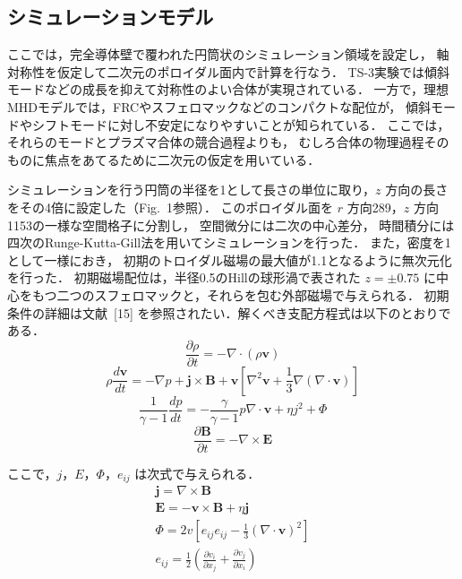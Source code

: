 \documentclass{jspf}            %
\begin{document}
\subsection{シミュレーションモデル}

ここでは，完全導体壁で覆われた円筒状のシミュレーション領域を設定し，
軸対称性を仮定して二次元のポロイダル面内で計算を行なう．
TS-3実験では傾斜モードなどの成長を抑えて対称性のよい合体が実現されている．
一方で，理想MHDモデルでは，FRCやスフェロマックなどのコンパクトな配位が，
傾斜モードやシフトモードに対し不安定になりやすいことが知られている．
ここでは，それらのモードとプラズマ合体の競合過程よりも，
むしろ合体の物理過程そのものに焦点をあてるために二次元の仮定を用いている．

シミュレーションを行う円筒の半径を1として長さの単位に取り，$z$
方向の長さをその4倍に設定した（Fig.~1参照）．
このポロイダル面を $r$ 方向289，$z$ 方向1153の一様な空間格子に分割し，
空間微分には二次の中心差分，
時間積分には四次のRunge-Kutta-Gill法を用いてシミュレーションを行った．
また，密度を1として一様におき，
初期のトロイダル磁場の最大値が1.1となるように無次元化を行った．
初期磁場配位は，半径0.5のHillの球形渦で表された $z = \pm 0.75$
に中心をもつ二つのスフェロマックと，それらを包む外部磁場で与えられる．
初期条件の詳細は文献~[15] を参照されたい．解くべき支配方程式は以下のとおりである．
\begin{equation}
  \frac{\partial\rho}{\partial t} = -\nabla\cdot(\rho\boldsymbol{v})
\end{equation}
\begin{equation}
  \rho\frac{d\boldsymbol{v}}{dt} =
  - \nabla p + \boldsymbol{j} \times \boldsymbol{B}
  + \boldsymbol{v} \left[\nabla^2\boldsymbol{v}
    + \frac{1}{3}\nabla(\nabla\cdot\boldsymbol{v}) \right]
\end{equation}
\begin{equation}
  \frac{1}{\gamma-1}\frac{dp}{dt} =
  -\frac{\gamma}{\gamma-1}p\nabla\cdot\boldsymbol{v}
  +\eta j^2 + \Phi
\end{equation}
\begin{equation}
  \frac{\partial\boldsymbol{B}}{\partial t} =
  - \nabla\times\boldsymbol{E}
\end{equation}

ここで，$j$，$E$，$\Phi$，$e_{ij}$ は次式で与えられる．
\begin{gather}
  \boldsymbol{j} = \nabla\times\boldsymbol{B} \\
  \boldsymbol{E} = -\boldsymbol{v} \times \boldsymbol{B}
  + \eta \boldsymbol{j} \\
  \Phi = 2v\left[
    e_{ij}e_{ij} - \frac{1}{3}(\nabla\cdot\boldsymbol{v})^2\right] \\
  e_{ij} = \frac{1}{2}\left(
    \frac{\partial v_i}{\partial x_j} +
    \frac{\partial v_j}{\partial x_i} \right)
\end{gather}
\end{document}
